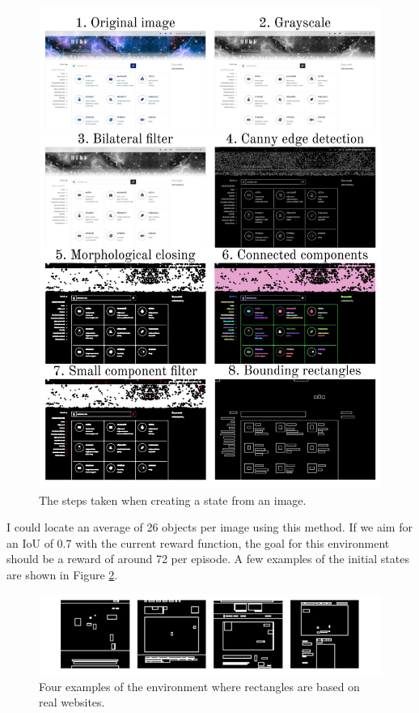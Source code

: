 \documentclass[
  digital,     %
  oneside,     %
  nosansbold,  %
  nocolorbold, %
  lof,         %
  lot,         %
]{fithesis4}
\begin{document}
\begin{figure}
    \centering
    \includegraphics[width=1\linewidth]{diagrams/simple_detector.pdf}
    \caption{The steps taken when creating a state from an image.}
    \label{fig:simple-detector}
\end{figure}

I could locate an average of 26 objects per image using this method. If we aim for an IoU of 0.7 with the current reward function, the goal for this environment should be a reward of around 72 per episode. A few examples of the initial states are shown in Figure \ref{fig:env8}.

\begin{figure}
    \centering
    \includegraphics[width=1\linewidth]{env_examples/env8.pdf}
    \caption{Four examples of the environment where rectangles are based on real websites.}
    \label{fig:env8}
\end{figure}
\end{document}
